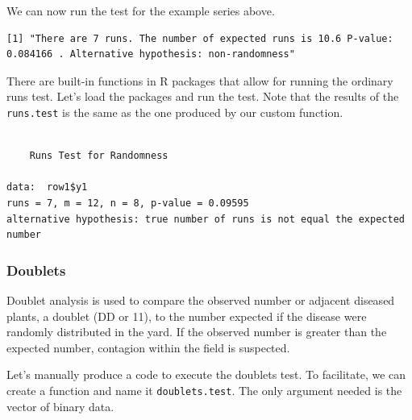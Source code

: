 \documentclass[
  letterpaper,
  DIV=11,
  numbers=noendperiod]{scrreprt}
\newenvironment{Shaded}{\begin{snugshade}}{\end{snugshade}}
\newcommand{\CommentTok}[1]{\textcolor[rgb]{0.37,0.37,0.37}{#1}}
\newcommand{\FunctionTok}[1]{\textcolor[rgb]{0.28,0.35,0.67}{#1}}
\newcommand{\NormalTok}[1]{\textcolor[rgb]{0.00,0.23,0.31}{#1}}
\newcommand{\OtherTok}[1]{\textcolor[rgb]{0.00,0.23,0.31}{#1}}
\newcommand{\SpecialCharTok}[1]{\textcolor[rgb]{0.37,0.37,0.37}{#1}}
\begin{document}
We can now run the test for the example series above.

\begin{Shaded}
\end{Shaded}

\begin{verbatim}
[1] "There are 7 runs. The number of expected runs is 10.6 P-value: 0.084166 . Alternative hypothesis: non-randomness"
\end{verbatim}

There are built-in functions in R packages that allow for running the
ordinary runs test. Let's load the packages and run the test. Note that
the results of the \texttt{runs.test} is the same as the one produced by
our custom function.

\begin{Shaded}
\end{Shaded}

\begin{verbatim}

    Runs Test for Randomness

data:  row1$y1
runs = 7, m = 12, n = 8, p-value = 0.09595
alternative hypothesis: true number of runs is not equal the expected number
\end{verbatim}

\hypertarget{doublets}{%
\subsubsection{Doublets}\label{doublets}}

Doublet analysis is used to compare the observed number or adjacent
diseased plants, a doublet (DD or 11), to the number expected if the
disease were randomly distributed in the yard. If the observed number is
greater than the expected number, contagion within the field is
suspected.

Let's manually produce a code to execute the doublets test. To
facilitate, we can create a function and name it \texttt{doublets.test}.
The only argument needed is the vector of binary data.
\end{document}
